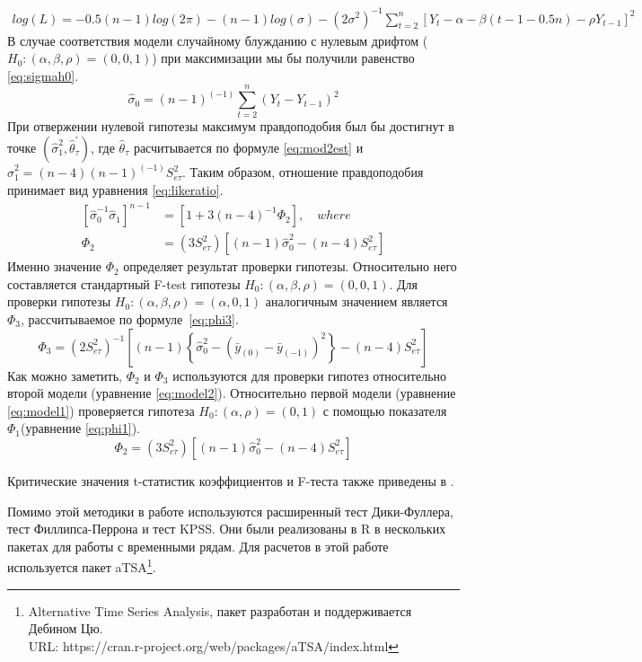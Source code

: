 \documentclass[a4paper,12pt]{article}
\begin{document}
\begin{align}
\label{eq:likefun}
log{(L)}=-0.5(n-1)log(2\pi)-(n-1)log{(\sigma)}-(2\sigma^2)^{-1}\sum_{t=2}^{n}
\left[Y_t-\alpha-\beta(t-1-0.5n)-\rho Y_{t-1}\right]^2
\end{align}
В случае соответствия модели случайному блужданию с нулевым дрифтом ($H_0:(\alpha,\beta,\rho)=(0,0,1)$) при максимизации мы бы получили равенство \ref{eq:sigmah0}.
\begin{equation}
  \label{eq:sigmah0}
  \hat{\sigma}_0=(n-1)^{(-1)}\sum_{t=2}^n(Y_t-Y_{t-1})^2
\end{equation}
При отвержении нулевой гипотезы максимум правдоподобия был бы достигнут в точке $(\hat{\sigma}_1^2,\hat{\theta}_\tau^{'})$, где $\hat{\theta}_\tau$ расчитывается по формуле \ref{eq:mod2est} и $\hat{\sigma}_1^2=(n-4)(n-1)^{(-1)}S^2_{e\tau}$. Таким образом, отношение правдоподобия принимает вид уравнения \ref{eq:likeratio}.
\begin{align}
  \label{eq:likeratio}
  \left[\hat{\sigma}_0^{-1}\hat{\sigma}_1\right]^{n-1}&=\left[1+3(n-4)^{-1}\Phi_2\right],\quad where\\
  \Phi_2&=(3S^2_{e\tau})\left[(n-1)\hat{\sigma}_0^2-(n-4)S^2_{e\tau}\right]
\end{align}
Именно значение $\Phi_2$ определяет результат проверки гипотезы. Относительно него составляется стандартный F-test гипотезы $H_0:(\alpha,\beta,\rho)=(0,0,1)$. Для проверки гипотезы $H_0:(\alpha,\beta,\rho)=(\alpha,0,1)$ аналогичным значением является~$\Phi_3$, рассчитываемое по формуле~\ref{eq:phi3}.
\begin{equation}
  \label{eq:phi3}
  \Phi_3=(2S_{e\tau}^2)^{-1}
  \left[
    (n-1)
      \left\{
        \hat{\sigma}_0^2-(\bar{y}_{(0)}-\bar{y}_{(-1)})^2
      \right\}
      -(n-4)S^2_{e\tau}
  \right]
\end{equation}
Как можно заметить, $\Phi_2$ и $\Phi_3$ используются для проверки гипотез относительно второй модели (уравнение \ref{eq:model2}). Относительно первой модели (уравнение \ref{eq:model1}) проверяется гипотеза $H_0:(\alpha,\rho)=(0,1)$ с помощью показателя $\Phi_1$(уравнение \ref{eq:phi1}).
\begin{equation}
  \label{eq:phi1}
  \Phi_2=(3S^2_{e\tau})\left[(n-1)\hat{\sigma}_0^2-(n-4)S^2_{e\tau}\right]
\end{equation}

Критические значения t-статистик коэффициентов и F-теста также приведены в \cite{Dickey1981}.

Помимо этой методики в работе используются расширенный тест Дики-Фуллера, тест Филлипса-Перрона и тест KPSS. Они были реализованы в R в нескольких пакетах для работы с временными рядам. Для расчетов в этой работе используется пакет aTSA\footnote{Alternative Time Series Analysis, пакет разработан и поддерживается Дебином Цю. \\URL: https://cran.r-project.org/web/packages/aTSA/index.html}.
\end{document}
